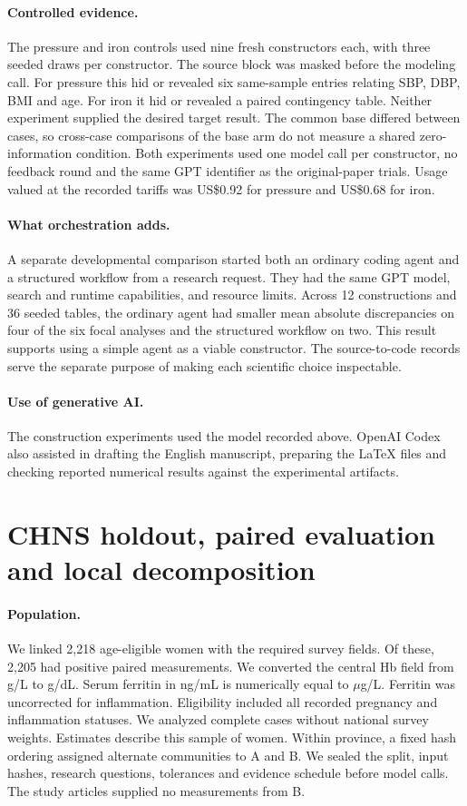 \paragraph{Controlled evidence.}
The pressure and iron controls used nine fresh constructors each, with three seeded draws per constructor. The source block was masked before the modeling call. For pressure this hid or revealed six same-sample entries relating SBP, DBP, BMI and age. For iron it hid or revealed a paired contingency table. Neither experiment supplied the desired target result. The common base differed between cases, so cross-case comparisons of the base arm do not measure a shared zero-information condition. Both experiments used one model call per constructor, no feedback round and the same GPT identifier as the original-paper trials. Usage valued at the recorded tariffs was US\$0.92 for pressure and US\$0.68 for iron.

\paragraph{What orchestration adds.}
A separate developmental comparison started both an ordinary coding agent and a structured workflow from a research request. They had the same GPT model, search and runtime capabilities, and resource limits. Across 12 constructions and 36 seeded tables, the ordinary agent had smaller mean absolute discrepancies on four of the six focal analyses and the structured workflow on two. This result supports using a simple agent as a viable constructor. The source-to-code records serve the separate purpose of making each scientific choice inspectable.

\paragraph{Use of generative AI.}
The construction experiments used the model recorded above. OpenAI Codex also assisted in drafting the English manuscript, preparing the \LaTeX{} files and checking reported numerical results against the experimental artifacts.

\section{CHNS holdout, paired evaluation and local decomposition}
\label{app:chns}
\paragraph{Population.}
We linked 2,218 age-eligible women with the required survey fields. Of these, 2,205 had positive paired measurements. We converted the central Hb field from g/L to g/dL. Serum ferritin in ng/mL is numerically equal to $\mu$g/L. Ferritin was uncorrected for inflammation. Eligibility included all recorded pregnancy and inflammation statuses. We analyzed complete cases without national survey weights. Estimates describe this sample of women. Within province, a fixed hash ordering assigned alternate communities to A and B. We sealed the split, input hashes, research questions, tolerances and evidence schedule before model calls. The study articles supplied no measurements from B.

